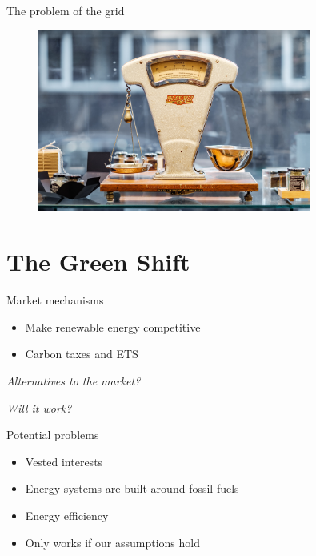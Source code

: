 \documentclass{beamer}
\begin{document}
\begin{frame}{The problem of the grid}
\begin{figure}[htpb]
	\centering
	\includegraphics[width=0.8\textwidth]{../img/balance.jpg}
\end{figure}
\end{frame}

\section{The Green Shift}

\begin{frame}{Market mechanisms} %
\begin{itemize}
    \item Make renewable energy competitive \pause
    \item Carbon taxes and ETS
\end{itemize}{}
\end{frame}{}

\begin{frame}{}
\centering
\textit{\Large{Alternatives to the market?}} %
\end{frame}{}

\begin{frame}{}
\centering
\textit{\Large{Will it work?}} %
\end{frame}{}

\begin{frame}{Potential problems}
\begin{itemize}
    \item Vested interests \pause
    \item Energy systems are built around fossil fuels \pause 
    \item Energy efficiency \pause
    \item Only works if our assumptions hold %
\end{itemize}{}
\end{frame}{}
\end{document}

